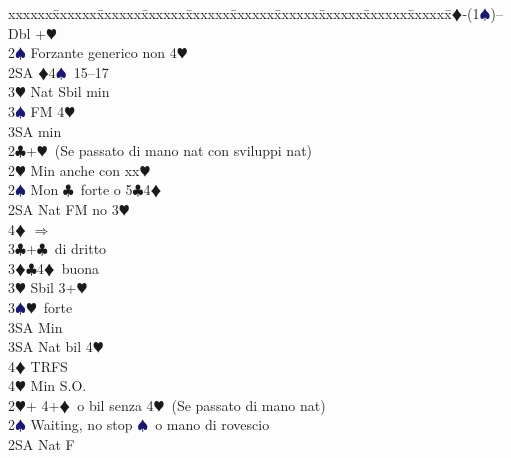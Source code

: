 \documentclass[a4paper,italian]{article}
\newcommand{\BC}{\textcolor{OliveGreen}{$\clubsuit$}}
\newcommand{\BD}{\textcolor{RedOrange}{$\vardiamondsuit$}}
\newcommand{\BH}{\textcolor{Red2}{$\varheartsuit${}}}
\newcommand{\BS}{\textcolor{MidnightBlue}{$\spadesuit${}}}
\newenvironment{bidtable}
{\begin{tabbing}

    xxxxxx\=xxxxxx\=xxxxxx\=xxxxxx\=xxxxxx\=xxxxxx\=xxxxxx\=xxxxxx\=xxxxxx\=xxxxxx\=\kill}
{\end{tabbing} }%
\begin{document}
\begin{multicols*}{2}
                                        \begin{bidtable}
                                            1\BD-(1\BS)--\+\\
                                            Dbl +\BH \+\\
                                            2\BS \> Forzante generico non 4\BH \\
                                            2SA \BD 4\BS\ 15--17\\
                                            3\BH \> Nat Sbil min\\
                                            3\BS \> FM 4\BH \+\\
                                            3SA \> min\-\-\\
                                            2\BC {}+\BH\ (Se passato di mano nat con sviluppi nat)\+\\
                                            2\BH \> Min anche con xx\BH \\
                                            2\BS \> Mon \BC\ forte o 5\BC 4\BD \\
                                            2SA \> Nat FM no 3\BH \+\\
                                            4\BD \> $\Rightarrow$\-\\
                                            3\BC {}+\BC\ di dritto\\
                                            3\BD {}\BC 4\BD\ buona\\
                                            3\BH \> Sbil 3+\BH \\
                                            3\BS {}\BH\ forte\+\\
                                            3SA \> Min\-\\
                                            3SA \> Nat bil 4\BH \+\\
                                            4\BD \> TRFS\-\\
                                            4\BH \> Min S.O.\-\\
                                            2\BH {}+ 4+\BD\ o bil senza 4\BH\ (Se passato di mano nat)\+\\
                                            2\BS \> Waiting, no stop \BS\ o mano di rovescio\+\\
                                            2SA \> Nat F\+\\

\end{bidtable}
\end{multicols*}
\end{document}
